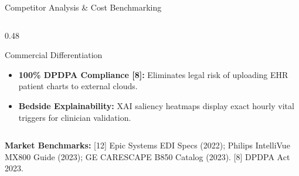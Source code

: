 \documentclass[aspectratio=169, 11pt]{beamer}
\begin{document}
\begin{frame}{Competitor Analysis \& Cost Benchmarking}
\begin{columns}[t]
        \begin{column}{0.48\textwidth}
            \begin{block}{\textcolor{neonTeal}{Commercial Differentiation}}
                \tiny
                \begin{itemize}
                    \item \textbf{100\% DPDPA Compliance [8]:} Eliminates legal risk of uploading EHR patient charts to external clouds.
                    \item \textbf{Bedside Explainability:} XAI saliency heatmaps display exact hourly vital triggers for clinician validation.
                \end{itemize}
            \end{block}
        \end{column}
    \end{columns}

    \vspace{0.02cm}
    \begin{block}{}
        \tiny \textcolor{neonCyan}{\textbf{Market Benchmarks:}} \textcolor{mutedText}{[12] Epic Systems EDI Specs (2022); Philips IntelliVue MX800 Guide (2023); GE CARESCAPE B850 Catalog (2023). [8] DPDPA Act 2023.}
    \end{block}
\end{frame}
\end{document}
